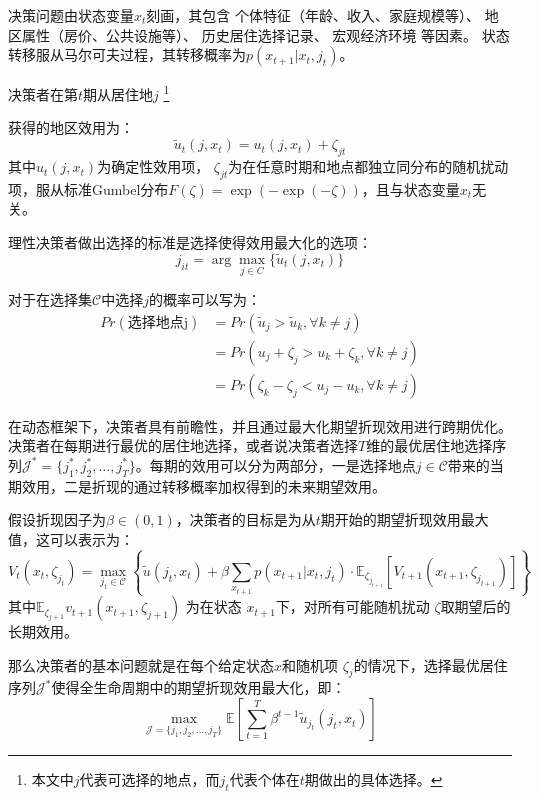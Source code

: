 \documentclass[
  a4paper,
  zihao=-4,
  fontset=mac,
  AutoFakeBold,
  AutoFakeSlant,
  oneside]{ctexbook}
\let\oldfootnote\footnote
\renewcommand{\footnote}[1]{%
  \oldfootnote{\setstretch{1.5}#1}%
}
\begin{document}
决策问题由状态变量$x_t$刻画，其包含
个体特征（年龄、收入、家庭规模等）、
地区属性（房价、公共设施等）、
历史居住选择记录、
宏观经济环境
等因素。
状态转移服从马尔可夫过程，其转移概率为$p(x_{t+1}|x_t,j_t)$。

决策者在第$t$期从居住地$j$
\footnote{本文中$j$代表可选择的地点，而$j_t$代表个体在$t$期做出的具体选择。}
获得的地区效用为：
\begin{equation}
  \tilde{u}_t(j, x_t) = u_t(j, x_t)  +  \zeta_{jt}
  \label{eq:地区效用函数}
\end{equation}
其中$u_t(j, x_t)$为确定性效用项，
$\zeta_{jt}$为在任意时期和地点都独立同分布的随机扰动项，服从标准Gumbel分布$F(\zeta) = \exp(-\exp(-\zeta))$，且与状态变量$x_t$无关。


理性决策者做出选择的标准是选择使得效用最大化的选项：
\begin{equation}
  j_{it} = \arg\max_{j \in C} \{\tilde{u}_t(j, x_t)\}
\end{equation}

对于在选择集$\mathcal{C}$中选择$j$的概率可以写为：
\begin{equation}
\begin{split}
  Pr(\text{选择地点j})&=Pr(\tilde u_j > \tilde u_k, \forall k \neq j)
  \\&=Pr(u_j+\zeta_j>u_k+\zeta_k, \forall k \neq j)
  \\&=Pr(\zeta_k-\zeta_j<u_j-u_k, \forall k \neq j)
\end{split}
\label{eq:C中地点选择j的概率}
\end{equation}

在动态框架下，决策者具有前瞻性，并且通过最大化期望折现效用进行跨期优化。决策者在每期进行最优的居住地选择，或者说决策者选择$T$维的最优居住地选择序列$\mathcal{J}^*=\{j_1^*,j_2^*,\ldots,j_T^*\}$。每期的效用可以分为两部分，一是选择地点$j \in \mathcal{C}$带来的当期效用，二是折现的通过转移概率加权得到的未来期望效用。

假设折现因子为$\beta \in (0,1)$，决策者的目标是为从$t$期开始的期望折现效用最大值，这可以表示为：
\begin{equation}
  V_t(x_t, \zeta_{j_t}) = \max_{j_t \in \mathcal{C}} 
  \left\{ 
  \tilde{u}(j_t, x_t) + \beta \sum_{x_{t+1}} p(x_{t+1} | x_t, j_t) \cdot \mathbb{E}_{\zeta_{j_{t+1}}} [ V_{t+1}(x_{t+1}, \zeta_{j_{t+1}}) ]
  \right\}
\end{equation}
其中$\mathbb{E}_{\zeta_{j+1}} v_{t+1}(x_{t+1},\zeta_{j+1})$
为在状态 
$x_{t+1}$下，对所有可能随机扰动 
$\zeta$取期望后的长期效用。

那么决策者的基本问题就是在每个给定状态$x$和随机项 $\zeta_j$的情况下，选择最优居住序列$\mathcal{J}^*$使得全生命周期中的期望折现效用最大化，即：
\begin{equation}
  \max_{\mathcal{J}=\{j_1,j_2,\ldots,j_T\}} \mathbb{E} [ \sum_{t=1}^{T} \beta^{t-1} \tilde{u}_{j_t}(j_t,x_t) ]
\end{equation}
\end{document}
